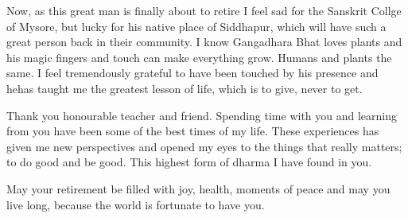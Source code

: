 Now, as this great man is finally about to retire I feel sad for the Sanskrit Collge of Mysore, but lucky for his native place of Siddhapur, which will have such a great person back in their community. I know Gangadhara Bhat loves plants and his magic fingers and touch can make everything grow. Humans and plants the same. I feel tremendously grateful to have been touched by his presence and hehas taught me the greatest lesson of life, which is to give, never to get.

Thank you honourable teacher and friend. Spending time with you and learning from you have been some of the best times of my life. These experiences has given me new perspectives and opened my eyes to the things that really matters; to do good and be good. This highest form of dharma I have found in you.

May your retirement be filled with joy, health, moments of peace and may you live long, because the world is fortunate to have you.
